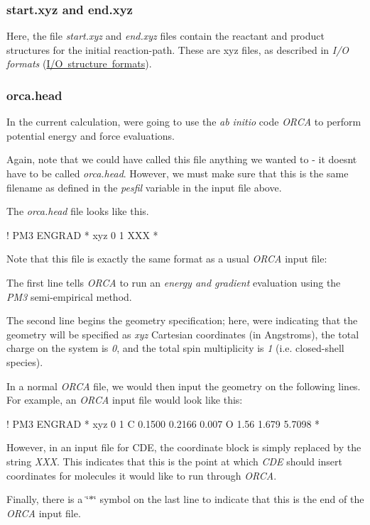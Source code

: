 \subsubsection*{start.\+xyz and end.\+xyz}

Here, the file {\itshape start.\+xyz} and {\itshape end.\+xyz} files contain the reactant and product structures for the initial reaction-\/path. These are xyz files, as described in {\itshape I/O formats} (\mbox{\hyperlink{formats}{I/O structure formats}}).

\subsubsection*{orca.\+head}

In the current calculation, we\textquotesingle{}re going to use the {\itshape ab initio} code {\itshape O\+R\+CA} to perform potential energy and force evaluations.

Again, note that we could have called this file anything we wanted to -\/ it doesn\textquotesingle{}t have to be called {\itshape orca.\+head}. However, we must make sure that this is the same filename as defined in the {\itshape pesfil} variable in the input file above.

The {\itshape orca.\+head} file looks like this. \begin{DoxyVerb}! PM3 ENGRAD
* xyz 0 1
XXX
*
\end{DoxyVerb}


Note that this file is exactly the same format as a usual {\itshape O\+R\+CA} input file\+:


\begin{DoxyItemize}
\item The first line tells {\itshape O\+R\+CA} to run an {\itshape energy and gradient} evaluation using the {\itshape P\+M3} semi-\/empirical method.
\item The second line begins the geometry specification; here, we\textquotesingle{}re indicating that the geometry will be specified as {\itshape xyz} Cartesian coordinates (in Angstroms), the total charge on the system is {\itshape 0}, and the total spin multiplicity is {\itshape 1} (i.\+e. closed-\/shell species).
\item In a normal {\itshape O\+R\+CA} file, we would then input the geometry on the following lines. For example, an {\itshape O\+R\+CA} input file would look like this\+: \begin{DoxyVerb}  ! PM3 ENGRAD
  * xyz 0 1
  C 0.1500  0.2166 0.007
  O 1.56  1.679  5.7098
  *
\end{DoxyVerb}

\item However, in an input file for C\+DE, the coordinate block is simply replaced by the string {\itshape X\+XX}. This indicates that this is the point at which {\itshape C\+DE} should insert coordinates for molecules it would like to run through {\itshape O\+R\+CA}.
\item Finally, there is a \char`\"{}$\ast$\char`\"{} symbol on the last line to indicate that this is the end of the {\itshape O\+R\+CA} input file.
\end{DoxyItemize}

